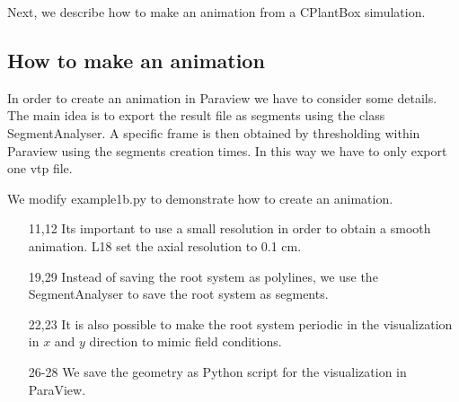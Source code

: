 Next, we describe how to make an animation from a CPlantBox simulation.


\subsection{How to make an animation} \label{ssec:animation}

In order to create an animation in Paraview we have to consider some details. The main idea is to export the result file as segments using the class SegmentAnalyser. A specific frame is then obtained by thresholding within Paraview using the segments creation times. In this way we have to only export one vtp file. 

We modify example1b.py to demonstrate how to create an animation.

 

\begin{itemize}

\item[11,12] Its important to use a small resolution in order to obtain a smooth animation. L18 set the axial resolution to 0.1 cm. 

\item[19,29] Instead of saving the root system as polylines, we use the SegmentAnalyser to save the root system as segments.

\item[22,23] It is also possible to make the root system periodic in the visualization in $x$ and $y$ direction to mimic field conditions.

\item[26-28] We save the geometry as Python script for the visualization in ParaView.

\end{itemize}

